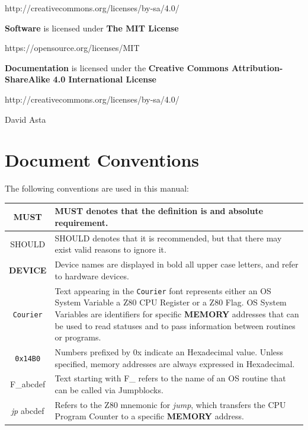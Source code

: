 \documentclass[a4paper,11pt]{article}
\begin{document}
    \hspace{1cm}http://creativecommons.org/licenses/by-sa/4.0/
    
    \textbf{Software} is licensed under \textbf{The MIT License}
    
    \hspace{1cm}https://opensource.org/licenses/MIT
    
    \textbf{Documentation} is licensed under the \textbf{Creative Commons
    Attribution-ShareAlike 4.0 International License}
    
    \hspace{1cm}http://creativecommons.org/licenses/by-sa/4.0/

    \normalsize

    \hrulefill

     David Asta

    \pagebreak
    \section*{Document Conventions}
    The following conventions are used in this manual:

    \begin{center}
        \begin{tabular}{c m{9cm}}
            \hline
            MUST & MUST denotes that the definition is and absolute
            requirement.\\
            \hline
            SHOULD & SHOULD denotes that it is recommended, but that there may
            exist valid reasons to ignore it.\\
            \hline
            \textbf{DEVICE} & Device names are displayed in bold all upper case 
            letters, and refer to hardware devices.\\
            \hline
            \texttt{Courier} & Text appearing in the \texttt{Courier} font 
            represents either an OS System Variable a Z80 CPU Register
            or a Z80 Flag. OS System Variables are identifiers for specific
            \textbf{MEMORY} addresses that can be used to read statuses and to
            pass information between routines or programs.\\
            \hline
            \texttt{0x14B0} & Numbers prefixed by 0x indicate an Hexadecimal value.
            Unless specified, memory addresses are always expressed in
            Hexadecimal.\\
            \hline
            F\_abcdef & Text starting with F\_ refers to the name of an OS 
            routine that can be called via Jumpblocks. \\
            \hline
            \textit{jp} abcdef & Refers to the Z80 mnemonic for \textit{jump},
            which transfers the CPU Program Counter to a specific \textbf{MEMORY}
            address.\\
            \hline
        \end{tabular}
    \end{center}
\end{document}
